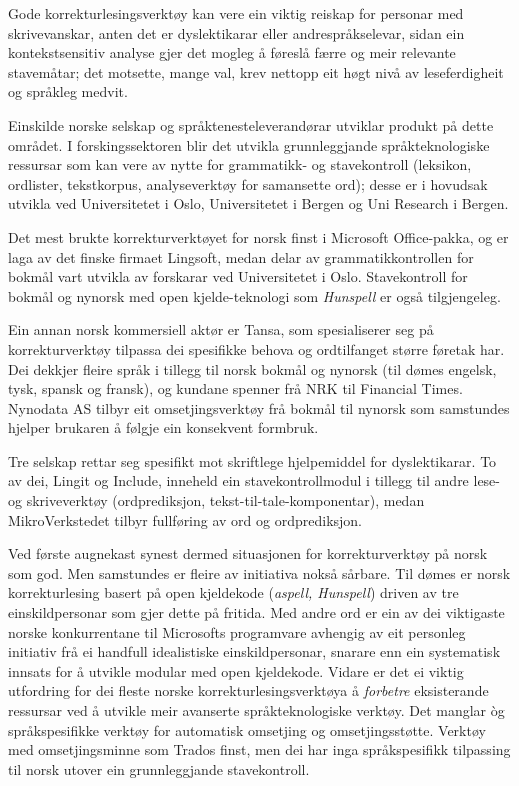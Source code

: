 \begin{multicols}{2}

Gode korrekturlesingsverktøy kan vere ein viktig reiskap for personar med skrivevanskar, anten det er dyslektikarar eller andrespråkselevar, sidan ein kontekstsensitiv analyse gjer det mogleg å føreslå færre og meir relevante stavemåtar; det motsette, mange val, krev nettopp eit høgt nivå av leseferdigheit og språkleg medvit.

Einskilde norske selskap og språktenesteleverandørar utviklar produkt på dette området. 
I forskingssektoren blir det utvikla grunnleggjande språkteknologiske ressursar som kan vere av nytte for grammatikk- og stavekontroll (leksikon, ordlister, tekstkorpus, analyseverktøy for samansette ord); desse er i hovudsak utvikla ved Universitetet i Oslo, Universitetet i Bergen og Uni Research i Bergen. 

Det mest brukte korrekturverktøyet for norsk finst i Microsoft Office-pakka, og er laga av det finske firmaet Lingsoft, medan delar av grammatikkontrollen for bokmål vart utvikla av forskarar ved Universitetet i Oslo. Stavekontroll for bokmål og nynorsk med open kjelde-teknologi som \textit{Hunspell} er også tilgjengeleg. 

Ein annan norsk kommersiell aktør er Tansa, som spesialiserer seg på korrekturverktøy tilpassa dei spesifikke behova og ordtilfanget større føretak har. 
Dei dekkjer fleire språk i tillegg til norsk bokmål og nynorsk (til dømes engelsk, tysk, spansk og fransk), og kundane spenner frå NRK til Financial Times. 
Nynodata AS tilbyr eit omsetjingsverktøy frå bokmål til nynorsk som samstundes hjelper brukaren å følgje ein konsekvent formbruk. 

Tre selskap rettar seg spesifikt mot skriftlege hjelpemiddel for dyslektikarar. To av dei, Lingit og Include, inneheld ein stavekontrollmodul i tillegg til andre lese- og skriveverktøy (ordprediksjon, tekst-til-tale-komponentar), medan MikroVerkstedet tilbyr fullføring av ord og ordprediksjon. 

Ved første augnekast synest dermed situasjonen for korrekturverktøy på norsk som god. 
Men samstundes er fleire av initiativa nokså sårbare. 
Til dømes er norsk korrekturlesing basert på open kjeldekode (\textit{aspell, Hunspell}) driven av tre einskildpersonar som gjer dette på fritida. 
Med andre ord er ein av dei viktigaste norske konkurrentane til Microsofts programvare avhengig av eit personleg initiativ frå ei handfull idealistiske einskildpersonar, snarare enn ein systematisk innsats for å utvikle modular med open kjeldekode. 
Vidare er det ei viktig utfordring for dei fleste norske korrekturlesingsverktøya å \textit{forbetre} eksisterande ressursar ved å utvikle meir avanserte språkteknologiske verktøy. Det manglar òg språkspesifikke verktøy for automatisk omsetjing og omsetjingsstøtte. Verktøy med omsetjingsminne som Trados finst, men dei har inga språkspesifikk tilpassing til norsk utover ein grunnleggjande stavekontroll. 


\end{multicols}

